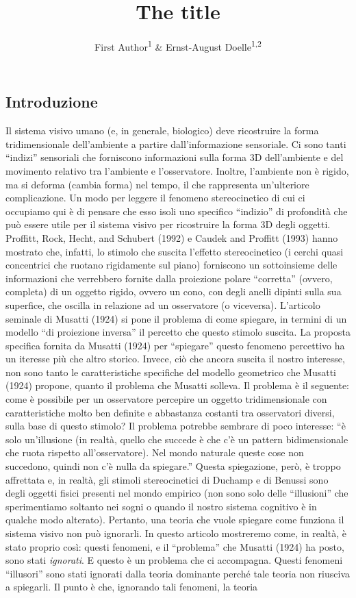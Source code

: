 \documentclass[
  man]{apa6}
\title{The title}
\author{First Author\textsuperscript{1} \& Ernst-August Doelle\textsuperscript{1,2}}
\date{}
\affiliation{\vspace{0.5cm}\textsuperscript{1} Wilhelm-Wundt-University\\\textsuperscript{2} Konstanz Business School}
\begin{document}
\maketitle

\subsection{Introduzione}\label{introduzione}

Il sistema visivo umano (e, in generale, biologico) deve ricostruire la forma tridimensionale dell'ambiente a partire dall'informazione sensoriale. Ci sono tanti ``indizi'' sensoriali che forniscono informazioni sulla forma 3D dell'ambiente e del movimento relativo tra l'ambiente e l'osservatore. Inoltre, l'ambiente non è rigido, ma si deforma (cambia forma) nel tempo, il che rappresenta un'ulteriore complicazione. Un modo per leggere il fenomeno stereocinetico di cui ci occupiamo qui è di pensare che esso isoli uno specifico ``indizio'' di profondità che può essere utile per il sistema visivo per ricostruire la forma 3D degli oggetti. Proffitt, Rock, Hecht, and Schubert (1992) e Caudek and Proffitt (1993) hanno mostrato che, infatti, lo stimolo che suscita l'effetto stereocinetico (i cerchi quasi concentrici che ruotano rigidamente sul piano) forniscono un sottoinsieme delle informazioni che verrebbero fornite dalla proiezione polare ``corretta'' (ovvero, completa) di un oggetto rigido, ovvero un cono, con degli anelli dipinti sulla sua superfice, che oscilla in relazione ad un osservatore (o viceversa). L'articolo seminale di Musatti (1924) si pone il problema di come spiegare, in termini di un modello ``di proiezione inversa'' il percetto che questo stimolo suscita. La proposta specifica fornita da Musatti (1924) per ``spiegare'' questo fenomeno percettivo ha un iteresse più che altro storico. Invece, ciò che ancora suscita il nostro interesse, non sono tanto le caratteristiche specifiche del modello geometrico che Musatti (1924) propone, quanto il problema che Musatti solleva. Il problema è il seguente: come è possibile per un osservatore percepire un oggetto tridimensionale con caratteristiche molto ben definite e abbastanza costanti tra osservatori diversi, sulla base di questo stimolo? Il problema potrebbe sembrare di poco interesse: ``è solo un'illusione (in realtà, quello che succede è che c'è un pattern bidimensionale che ruota rispetto all'osservatore). Nel mondo naturale queste cose non succedono, quindi non c'è nulla da spiegare.'' Questa spiegazione, però, è troppo affrettata e, in realtà, gli stimoli stereocinetici di Duchamp e di Benussi sono degli oggetti fisici presenti nel mondo empirico (non sono solo delle ``illusioni'' che sperimentiamo soltanto nei sogni o quando il nostro sistema cognitivo è in qualche modo alterato). Pertanto, una teoria che vuole spiegare come funziona il sistema visivo non può ignorarli. In questo articolo mostreremo come, in realtà, è stato proprio così: questi fenomeni, e il ``problema'' che Musatti (1924) ha posto, sono stati \emph{ignorati}. E questo è un problema che ci accompagna. Questi fenomeni ``illusori'' sono stati ignorati dalla teoria dominante perché tale teoria non riusciva a spiegarli. Il punto è che, ignorando tali fenomeni, la teoria 
\end{document}
